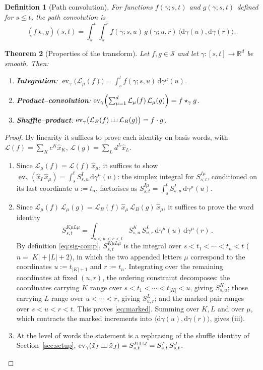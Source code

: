 \documentclass[11pt,a4paper]{article}
\newtheorem{theorem}{Theorem}[section]
\newtheorem{definition}[theorem]{Definition}
\DeclareMathOperator{\ev}{ev}
\newcommand{\xh}{\hat{x}}
\newcommand{\cL}{\mathcal{L}}
\newcommand{\dd}{\mathrm{d}}
\newcommand{\shuffle}{\mathbin{\text{\footnotesize$\sqcup\!\sqcup$}}}
\begin{document}
\begin{definition}[Path convolution]\label{def:path-conv}
For functions $f(\gamma;s,t)$ and $g(\gamma;s,t)$ defined for $s\leq t$, the \emph{path convolution} is
\begin{equation}\label{eq:path-conv}
  (f\star_\gamma g)(s,t)  = \int_s^t\!\int_s^r  f(\gamma;s,u)\,g(\gamma;u,r)\, \langle\dd\gamma(u),\dd\gamma(r)\rangle.
\end{equation}
\end{definition}

\begin{theorem}[Properties of the transform]\label{prop:ev-props}
Let $f,g\in\mathcal S$ and let $\gamma\colon[s,t]\to\mathbb{R}^d$ be smooth. Then:
\begin{enumerate}
\item \textbf{Integration}:
  $\ev_\gamma\bigl(\cL_\mu(f)\bigr)
  =\int_s^t f(\gamma;s,u)\,\dd\gamma^\mu(u)$.
\item \textbf{Product--convolution}: $\ev_\gamma\Bigl(\sum_{\mu=1}^d\cL_\mu(f)\,\cL_\mu(g)\Bigr)  = f\star_\gamma g$.
\item \textbf{Shuffle--product}: $\ev_\gamma\bigl(\cL_B(f)\shuffle\cL_B(g)\bigr)=f\cdot g$.
\end{enumerate}
\end{theorem}
\begin{proof}
By linearity it suffices to prove each identity on basis words, with $\cL(f)=\sum_K c^K\xh_K$, $\cL(g)=\sum_L d^L\xh_L$.
\begin{enumerate}
\item Since $\cL_\mu(f)=\cL(f)\,\xh_\mu$, it suffices to show $\ev_\gamma(\xh_I\,\xh_\mu)=\int_s^t S^I_{s,u}\,\dd\gamma^\mu(u)$: the simplex integral for $S^{I\mu}_{s,t}$, conditioned on its last coordinate $u:=t_n$, factorises as $S^{I\mu}_{s,t}=\int_s^t S^{I}_{s,u}\,\dd\gamma^\mu(u)$.
\item Since $\cL_\mu(f)\,\cL_\mu(g)=\cL_B(f)\,\xh_\mu\,\cL_B(g)\,\xh_\mu$, it suffices to prove the word identity
\begin{equation}\label{eq:marked}
  S^{K\mu L\mu}_{s,t}= \int_{s<u<r<t} S^{K}_{s,u}\,S^{L}_{u,r}\,\dd\gamma^{\mu}(u)\,\dd\gamma^{\mu}(r)\,.
\end{equation}
By definition \eqref{eq:sig-comp}, $S^{K\mu L\mu}_{s,t}$ is the integral over $s<t_1<\cdots<t_n<t$ ($n=|K|+|L|+2$), in which the two appended letters $\mu$ correspond to the coordinates $u:=t_{|K|+1}$ and $r:=t_n$. Integrating over the remaining coordinates at fixed $(u,r)$, the ordering constraint decomposes: the coordinates carrying $K$ range over $s<t_1<\cdots<t_{|K|}<u$, giving $S^{K}_{s,u}$; those carrying $L$ range over $u<\cdots<r$, giving $S^{L}_{u,r}$; and the marked pair ranges over $s<u<r<t$. This proves \eqref{eq:marked}. Summing over $K,L$ and over $\mu$, which contracts the marked increments into $\langle\dd\gamma(u),\dd\gamma(r)\rangle$, gives (iii).
\item At the level of words the statement is a rephrasing of the shuffle identity of Section~\ref{sec:setup}, $\ev_\gamma(\xh_I\shuffle\xh_J)=S^{I\shuffle J}_{s,t} =S^I_{s,t}\,S^J_{s,t}$.

\end{enumerate}
\end{proof}
\end{document}

